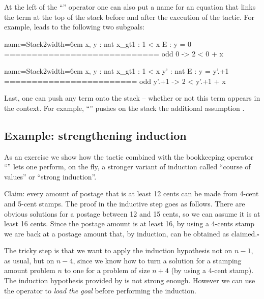 At the left of the ``\C{:}'' operator one can also put a name for an
equation that links the term at the top of the stack before and
after the execution of the tactic. For example,
  leads to
the following two subgoals:

\begin{coqout}{name=Stack2}{width=6cm}
 x, y : nat
 x_gt1 : 1 < x
 E : y = 0
============================
 odd 0 -> 2 < 0 + x
\end{coqout}
\begin{coqout}{name=Stack2}{width=6cm}
 x, y : nat
 x_gt1 : 1 < x
 y' : nat
 E : y = y'.+1
========================
 odd y'.+1 -> 2 < y'.+1 + x
\end{coqout}

Last, one can push any term onto the stack -- whether or not this
term appears in the context. For example,
``'' pushes on the stack
the additional assumption .


\subsection{Example: strengthening induction}
\label{sec:strongind}

As an exercise we show how the  tactic combined with the bookkeeping
operator ``\C{:}'' lets one perform, on the fly, a stronger variant of
induction called ``course of values'' or ``strong induction''.

Claim: every amount of postage that is at least 12 cents
can be made from 4-cent and 5-cent stamps.  The proof in the inductive
step goes as follows.  There are obvious solutions for a postage between
12 and 15 cents, so we can assume it is at least 16 cents.  Since
the postage amount is at least 16, by using a 4-cents stamp we are back
at a postage amount that, by induction, can be obtained as claimed.\hfill$\square$

The tricky step is that we want to apply the induction hypothesis not
on $n-1$, as usual, but on $n-4$, since we know how to turn a
solution for a stamping amount problem $n$ to one for a problem of
size $n+4$ (by using a 4-cent stamp).
The induction hypothesis provided by 
is not strong enough.  However we can use the \C{:} operator
to \emph{load the goal} before performing the induction.

